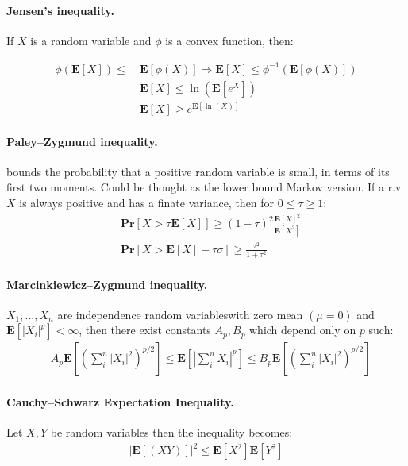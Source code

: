 \documentclass{article}
\newcommand{\prb}[1]{ \mathbf{Pr} \left[ {#1} \right]}
\newcommand{\expp}[1]{ \mathbf{E} \left[ {#1} \right]}
\newcommand{\indpr}{$ X_1, ..., X_n$ are independence random variables}
\begin{document}
\begin{multicols*}{2}
  \paragraph{Jensen's inequality.} If $X$ is a random variable and $\phi$ is a convex function, then:

  \begin{equation*}
    \begin{split}
       \phi\left( \expp{X} \right) \le \ & \expp{\phi\left( X \right)} \Rightarrow   \expp{X} \le \phi^{-1} \left( \expp{\phi\left( X \right)} \right) \\
      & \expp{X} \le \ln\left(\expp{e^{X}}  \right)  \\ 
      &  \expp{X} \ge e^{\expp{\ln \left( X \right)}}  
    \end{split}
  \end{equation*}
  \paragraph{Paley–Zygmund inequality.} bounds the probability that a positive random variable is small, in terms of its first two moments. Could be thought as the lower bound Markov version. If a r.v $X$ is always positive and has a finate variance, then for $0 \le \tau \ge 1$:  
  \begin{equation*}
    \begin{split}
     & \prb{ X > \tau \expp{X} } \ge \left( 1 - \tau \right)^{2}\frac{\expp{X}^{2}}{\expp{X^2}}\\
     &  \prb{ X > \expp{X} - \tau \sigma } \ge \frac{\tau^{2}}{1+\tau^{2}} 
    \end{split}
  \end{equation*}
  \paragraph{Marcinkiewicz–Zygmund inequality.} \indpr with zero mean $\left( \mu = 0  \right)$ and $\expp{|X_{i}|^{p}} < \infty$, then there exist constants $A_{p}, B_{p}$ which depend only on $p$ such:  
  \begin{equation*}
    \begin{split}
      & A_{p}\expp{\left( \sum_{i}^{n}{|X_{i}|^{2}} \right)^{p/2}  } \le \expp{|\sum_{i}^{n}{X_{i}}|^{p} }\le B_{p}\expp{\left( \sum_{i}^{n}{|X_{i}|^{2}} \right)^{p/2}  }        
    \end{split}
  \end{equation*}
  \paragraph{ Cauchy–Schwarz Expectation Inequality. } Let $X,Y$ be random variables then the inequality becomes: 
  \begin{equation*}
    \begin{split}
      |\expp{\left( XY \right)}|^{2}\le\expp{X^{2}}\expp{Y^{2}}
    \end{split}
  \end{equation*}

\end{multicols*}
\end{document}
